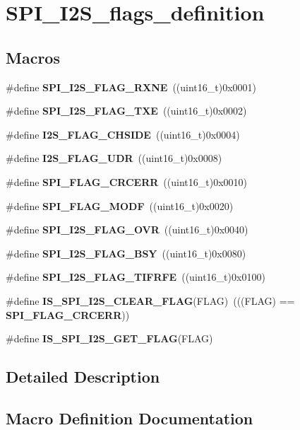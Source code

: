 \section{S\+P\+I\+\_\+\+I2\+S\+\_\+flags\+\_\+definition}
\label{group__SPI__I2S__flags__definition}
\subsection*{Macros}
\begin{DoxyCompactItemize}
\item 
\#define \textbf{ S\+P\+I\+\_\+\+I2\+S\+\_\+\+F\+L\+A\+G\+\_\+\+R\+X\+NE}~((uint16\+\_\+t)0x0001)
\item 
\#define \textbf{ S\+P\+I\+\_\+\+I2\+S\+\_\+\+F\+L\+A\+G\+\_\+\+T\+XE}~((uint16\+\_\+t)0x0002)
\item 
\#define \textbf{ I2\+S\+\_\+\+F\+L\+A\+G\+\_\+\+C\+H\+S\+I\+DE}~((uint16\+\_\+t)0x0004)
\item 
\#define \textbf{ I2\+S\+\_\+\+F\+L\+A\+G\+\_\+\+U\+DR}~((uint16\+\_\+t)0x0008)
\item 
\#define \textbf{ S\+P\+I\+\_\+\+F\+L\+A\+G\+\_\+\+C\+R\+C\+E\+RR}~((uint16\+\_\+t)0x0010)
\item 
\#define \textbf{ S\+P\+I\+\_\+\+F\+L\+A\+G\+\_\+\+M\+O\+DF}~((uint16\+\_\+t)0x0020)
\item 
\#define \textbf{ S\+P\+I\+\_\+\+I2\+S\+\_\+\+F\+L\+A\+G\+\_\+\+O\+VR}~((uint16\+\_\+t)0x0040)
\item 
\#define \textbf{ S\+P\+I\+\_\+\+I2\+S\+\_\+\+F\+L\+A\+G\+\_\+\+B\+SY}~((uint16\+\_\+t)0x0080)
\item 
\#define \textbf{ S\+P\+I\+\_\+\+I2\+S\+\_\+\+F\+L\+A\+G\+\_\+\+T\+I\+F\+R\+FE}~((uint16\+\_\+t)0x0100)
\item 
\#define \textbf{ I\+S\+\_\+\+S\+P\+I\+\_\+\+I2\+S\+\_\+\+C\+L\+E\+A\+R\+\_\+\+F\+L\+AG}(F\+L\+AG)~(((F\+L\+AG) == \textbf{ S\+P\+I\+\_\+\+F\+L\+A\+G\+\_\+\+C\+R\+C\+E\+RR}))
\item 
\#define \textbf{ I\+S\+\_\+\+S\+P\+I\+\_\+\+I2\+S\+\_\+\+G\+E\+T\+\_\+\+F\+L\+AG}(F\+L\+AG)
\end{DoxyCompactItemize}


\subsection{Detailed Description}


\subsection{Macro Definition Documentation}
\mbox{\label{group__SPI__I2S__flags__definition_gaf0d629fd522a15aff188236d3254b2ad}} 
